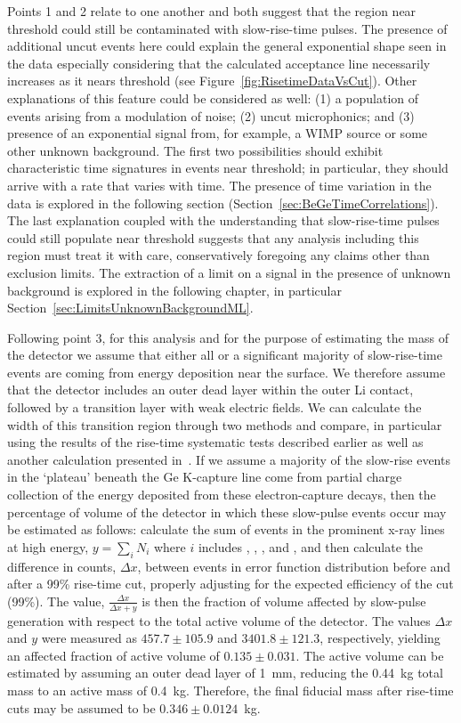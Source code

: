 	Points 1 and 2 relate to one another and both suggest that the region near threshold could still be contaminated with slow-rise-time pulses.  The presence of additional uncut events here could explain the general exponential shape seen in the data especially considering that the calculated acceptance line necessarily increases as it nears threshold (see Figure~\ref{fig:RisetimeDataVsCut}).  Other explanations of this feature could be considered as well: (1) a population of events arising from a modulation of noise; (2) uncut microphonics; and (3) presence of an exponential signal from, for example, a WIMP source or some other unknown background.  The first two possibilities should exhibit characteristic time signatures in events near threshold; in particular, they should arrive with a rate that varies with time.  The presence of time variation in the data is explored in the following section (Section~\ref{sec:BeGeTimeCorrelations}).  The last explanation coupled with the understanding that slow-rise-time pulses could still populate near threshold suggests that any analysis including this region must treat it with care, conservatively foregoing any claims other than exclusion limits.  The extraction of a limit on a signal in the presence of unknown background is explored in the following chapter, in particular Section~\ref{sec:LimitsUnknownBackgroundML}.  
	
	Following point 3, for this analysis and for the purpose of estimating the mass of the detector we assume that either all or a significant majority of slow-rise-time events are coming from energy deposition near the surface.  We therefore assume that the detector includes an outer dead layer within the outer Li contact, followed by a transition layer with weak electric fields.  We can calculate the width of this transition region through two methods and compare, in particular using the results of the rise-time systematic tests described earlier as well as another calculation presented in~\cite{Aalseth:2010aa}.  If we assume a majority of the slow-rise events in the `plateau' beneath the Ge K-capture line come from partial charge collection of the energy deposited from these electron-capture decays, then the percentage of volume of the detector in which these slow-pulse events occur may be estimated as follows:  calculate the sum of events in the prominent x-ray lines at high energy, $ y = \sum_{i} N_{i}$ where $i$ includes \gersixeight, \galsixeight, \znsixfive, and \asseventhree, and then calculate the difference in counts, $\Delta x$, between events in error function distribution before and after a 99\% rise-time cut, properly adjusting for the expected efficiency of the cut (99\%).  The value, $\frac{\Delta x}{\Delta x + y}$ is then the fraction of volume affected by slow-pulse generation with respect to the total active volume of the detector.  The values $\Delta x$ and $y$ were measured as $457.7\pm105.9$ and $3401.8\pm121.3$, respectively, yielding an affected fraction of active volume of $0.135\pm0.031$.  The active volume can be estimated by assuming an outer dead layer of 1~mm, reducing the 0.44~kg total mass to an active mass of 0.4~kg.  Therefore, the final fiducial mass after rise-time cuts may be assumed to be $0.346\pm0.0124$~kg.

